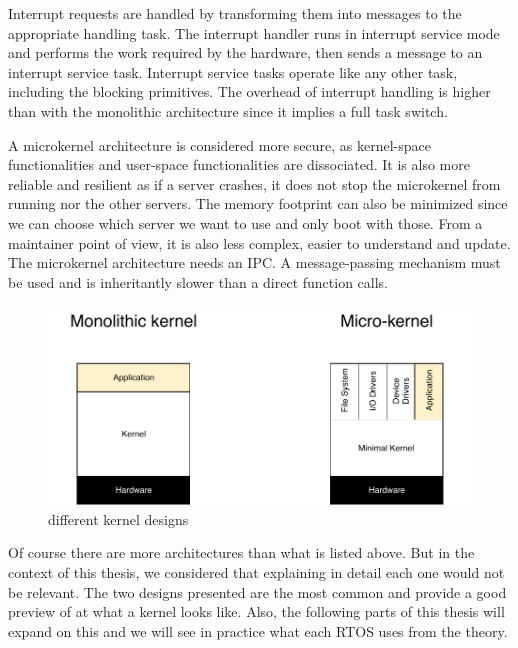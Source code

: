 Interrupt requests are handled by transforming them into messages to the appropriate handling task.
The interrupt handler runs in interrupt service mode and performs the work required by the hardware, then sends a message to an interrupt service task.
Interrupt service tasks operate like any other task, including the blocking primitives.
The overhead of interrupt handling is higher than with the monolithic architecture since it implies a full task switch.

A microkernel architecture is considered more secure, as kernel-space functionalities and user-space functionalities are dissociated.
It is also more reliable and resilient as if a server crashes, it does not stop the microkernel from running nor the other servers.
The memory footprint can also be minimized since we can choose which server we want to use and only boot with those.
From a maintainer point of view, it is also less complex, easier to understand and update.
The microkernel architecture needs an IPC.
A message-passing mechanism must be used and is inheritantly slower than a direct function calls.
\\
\begin{figure}[!h]
    \centering
    \includegraphics[scale=0.7]{assets/kernel_types.pdf}
    \caption{\label{fig:kernel-types}different kernel designs}
\end{figure}

Of course there are more architectures than what is listed above.
But in the context of this thesis, we considered that explaining in detail each one would not be relevant.
The two designs presented are the most common and provide a good preview of at what a kernel looks like.
Also, the following parts of this thesis will expand on this
    and we will see in practice what each RTOS uses from the theory.
